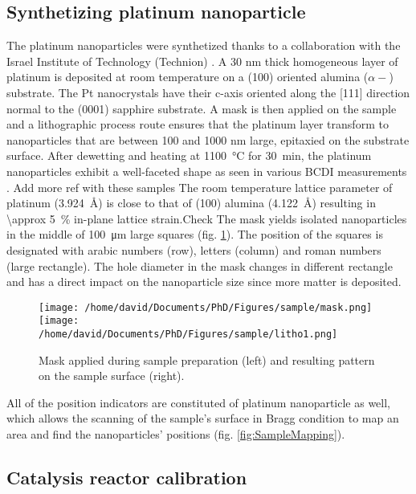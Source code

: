 \subsection{Synthetizing platinum nanoparticle}

The platinum nanoparticles were synthetized thanks to a collaboration with the Israel Institute of Technology (Technion) \parencite{Dupraz2017}.
A 30 nm thick homogeneous layer of platinum is deposited at room temperature on a (100) oriented alumina ($\alpha-$) substrate.
The Pt nanocrystals have their c-axis oriented along the [111] direction normal to the (0001) sapphire substrate.
A mask is then applied on the sample and a lithographic process route ensures that the platinum layer transform to nanoparticles that are between 100 and 1000 nm large,  epitaxied on the substrate surface.
After dewetting and heating at \qty{1100}{\degreeCelsius} for \qty{30}{\minute}, the platinum nanoparticles exhibit a well-faceted shape as seen in various BCDI measurements \parencite{Dupraz2017}. \textcolor{Important}{Add more ref with these samples}
The room temperature lattice parameter of platinum (\qty{3.924}{\angstrom}) is close to that of (100) alumina (\qty{4.122}{\angstrom}) resulting in \qty{\approx 5}{\percent} in-plane lattice strain.\textcolor{Important}{Check}
The mask yields isolated nanoparticles in the middle of \qty{100}{\um} large squares (fig. \ref{fig:Mask}).
The position of the squares is designated with arabic numbers (row), letters (column) and roman numbers (large rectangle).
The hole diameter in the mask changes in different rectangle and has a direct impact on the nanoparticle size since more matter is deposited.

\begin{figure}[!htb]
    \centering
    \texttt{[image: /home/david/Documents/PhD/Figures/sample/mask.png]}
    \texttt{[image: /home/david/Documents/PhD/Figures/sample/litho1.png]}
    \caption{
    	Mask applied during sample preparation (left) and resulting pattern on the sample surface (right).
    }
    \label{fig:Mask}
\end{figure}

All of the position indicators are constituted of platinum nanoparticle as well, which allows the scanning of the sample's surface in Bragg condition to map an area and find the nanoparticles' positions (fig. \ref{fig:SampleMapping}).

\subsection{Catalysis reactor calibration}

